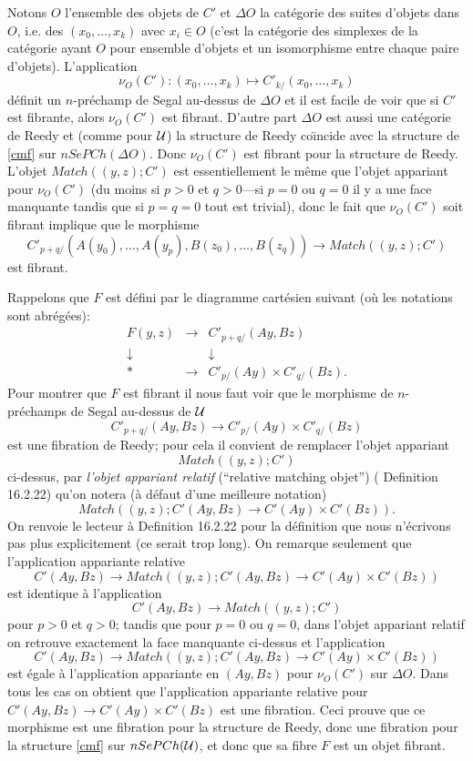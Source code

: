 \documentclass[12pt]{article}
\newcommand{\Uu}{{\cal U}}
\begin{document}
Notons $O$ l'ensemble
des objets de $C'$ et $\Delta O$ la cat\'egorie des suites d'objets dans
$O$, i.e.
des $(x_0,\ldots , x_k)$ avec $x_i\in O$ (c'est la cat\'egorie des simplexes
de la cat\'egorie ayant $O$
pour ensemble d'objets et un isomorphisme entre chaque paire d'objets).
L'application $$
\nu _O(C'): (x_0,\ldots , x_k)\mapsto C'_{k/}(x_0,\ldots , x_k)
$$
d\'efinit un $n$-pr\'echamp de Segal au-dessus de $\Delta O$ et il est facile de
voir que si $C'$ est fibrante, alors $\nu _O(C')$ est fibrant.
D'autre part $\Delta O$ est aussi une cat\'egorie de Reedy et (comme pour $\Uu$)
la structure de Reedy co\"{\i}ncide avec la structure de \ref{cmf} sur
$nSePCh(\Delta O)$. Donc $\nu _O(C')$ est fibrant pour la structure de Reedy.
L'objet $Match ((y,z); C')$ est essentiellement le m\^eme
que l'objet appariant pour $\nu _O(C')$
(du moins si $p>0$ et
$q>0$---si $p=0$ ou $q=0$ il y a une face manquante tandis que si $p=q=0$ tout
est trivial), donc le fait que  $\nu
_O(C')$ soit fibrant implique que le morphisme
$$
C'_{p+q/}(A(y_0),\ldots ,  A(y_p),
B(z_0),\ldots , B(z_q))\rightarrow
Match ((y,z); C')
$$
est fibrant.

Rappelons que $F$ est d\'efini par le diagramme cart\'esien
suivant (o\`u les notations sont abr\'eg\'ees):
$$
\begin{array}{ccc}
F(y,z) & \rightarrow & C'_{p+q/}(Ay,
Bz)\\
\downarrow && \downarrow \\
\ast & \rightarrow & C'_{p/}(Ay)\times
C'_{q/}(Bz).
\end{array}
$$
Pour montrer que
$F$ est fibrant il nous faut voir que le morphisme de $n$-pr\'echamps de
Segal au-dessus de $\Uu$
$$
C'_{p+q/}(Ay, Bz)\rightarrow C'_{p/}(Ay)\times
C'_{q/}(Bz)
$$
est une fibration de Reedy; pour cela il convient
de remplacer l'objet appariant
$$
Match((y,z);C')
$$
ci-dessus, par {\em l'objet appariant relatif}
(``relative matching objet'') (\cite{Hirschhorn} Definition 16.2.22)
qu'on notera (\`a d\'efaut d'une meilleure notation)
$$
Match((y,z);
C'(Ay,Bz)\rightarrow C'(Ay)\times C'(Bz)).
$$
On renvoie le lecteur \`a
\cite{Hirschhorn} Definition 16.2.22 pour la d\'efinition que nous
n'\'ecrivons pas plus explicitement (ce serait trop long).
On remarque seulement que l'application appariante relative
$$
C'(Ay,Bz)\rightarrow Match((y,z);
C'(Ay,Bz)\rightarrow C'(Ay)\times C'(Bz))
$$
est identique \`a l'application
$$
C'(Ay,Bz)\rightarrow Match((y,z);C')
$$
pour $p>0$ et $q>0$; tandis que pour $p=0$ ou $q=0$, dans l'objet appariant
relatif on retrouve exactement la face manquante ci-dessus et l'application
$$
C'(Ay,Bz)\rightarrow Match((y,z);
C'(Ay,Bz)\rightarrow C'(Ay)\times C'(Bz))
$$
est \'egale \`a l'application appariante en $(Ay,Bz)$ pour $\nu _O(C')$ sur
$\Delta O$. Dans tous les cas on obtient que l'application appariante relative
pour $C'(Ay,Bz)\rightarrow C'(Ay)\times C'(Bz)$ est une fibration. Ceci prouve
que ce morphisme est une fibration pour
la structure de Reedy, donc une fibration pour la
structure \ref{cmf} sur $nSePCh(\Uu )$, et donc que sa fibre $F$ est
un objet fibrant.
\end{document}
